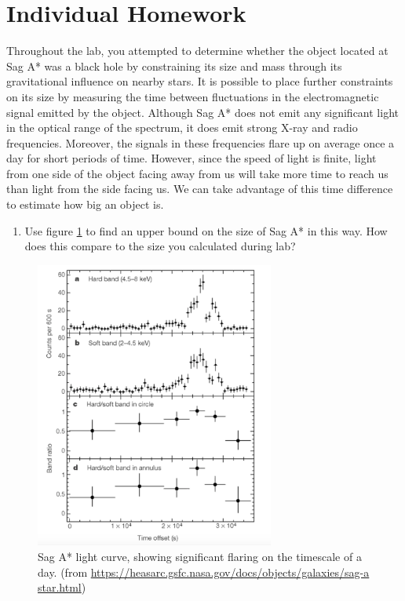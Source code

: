 \section{Individual Homework}
Throughout the lab, you attempted to determine whether the object located at Sag A* was a black hole by constraining its size and mass through its gravitational influence on nearby stars. It is possible to place further constraints on its size by measuring the time between fluctuations in the electromagnetic signal emitted by the object. Although Sag A* does not emit any significant light in the optical range of the spectrum, it does emit strong X-ray and radio frequencies. Moreover, the signals in these frequencies flare up on average once a day for short periods of time. However, since the speed of light is finite, light from one side of the object facing away from us will take more time to reach us than light from the side facing us. We can take advantage of this time difference to estimate how big an object is. 

\begin{enumerate}
	\item Use figure \ref{gc:fig:light-curve} to find an upper bound on the size of Sag A* in this way. How does this compare to the size you calculated during lab? 
\end{enumerate}

\begin{figure}
	\centering
	\includegraphics[width=0.7\textwidth]{galactic-center/sag-a-light-curve.png}
	\caption{Sag A* light curve, showing significant flaring on the timescale of a day.
		(from \url{https://heasarc.gsfc.nasa.gov/docs/objects/galaxies/sag-a star.html})}\label{gc:fig:light-curve}
\end{figure}

